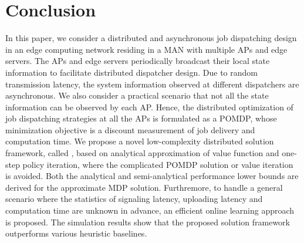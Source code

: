 \section{Conclusion}
\label{sec:conclusion}
In this paper, we consider a distributed and asynchronous job dispatching design in an edge computing network residing in a MAN with multiple APs and edge servers.
The APs and edge servers periodically broadcast their local state information to facilitate distributed dispatcher design.
Due to random transmission latency, the system information observed at different dispatchers are asynchronous.
We also consider a practical scenario that not all the state information can be observed by each AP.
Hence, the distributed optimization of job dispatching strategies at all the APs is formulated as a POMDP, whose minimization objective is a discount measurement of job delivery and computation time.
We propose a novel low-complexity distributed solution framework, called \algname, based on analytical approximation of value function and one-step policy iteration, where the complicated POMDP solution or value iteration is avoided. Both the analytical and semi-analytical performance lower bounds are derived for the approximate MDP solution.
Furthremore, to handle a general scenario where the statistics of signaling latency, uploading latency and computation time are unknown in advance, an efficient online learning approach is proposed.
The simulation results show that the proposed solution framework outperforms various heuristic baselines.
